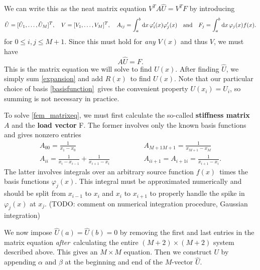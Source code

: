 We can write this as the neat matrix equation $V^T A \hat{U} = V^T F$ by introducing
\begin{equation*}
	\hat{U} = [\hat{U}_1, \dots, \hat{U}_M]^T,
	\quad
	V = [V_1, \dots, V_M]^T,
	\quad
	A_{ij} = \integral{\varphi'_i(x) \varphi'_j(x)}{x}{a}{b}
	\quad \text{and} \quad
	F_j = \integral{\varphi_j(x) f(x)}{x}{a}{b}.
\end{equation*}
for $0 \leq i, j \leq M+1$.
Since this must hold for \emph{any} $V(x)$ and thus $V$, we must have
\begin{equation}
	A \hat{U} = F.
	\label{fem_matrixeq}
\end{equation}
This is the matrix equation we will solve to find $U(x)$.
After finding $\hat{U}$, we simply sum \ref{expansion} and add $R(x)$ to find $U(x)$.
Note that our particular choice of basis \ref{basisfunction} gives the convenient property $U(x_i) = U_i$, so summing is not necessary in practice.

To solve \ref{fem_matrixeq}, we must first calculate the so-called \textbf{stiffness matrix} $A$ and the \textbf{load vector} F.
The former involves only the known basis functions and gives nonzero entries
\begin{align*}
	A_{00} = \frac{1}{x_1 - x_0}                           \qquad & \qquad A_{M+1 M+1} = \frac{1}{x_{M+1}-x_M} \\
	A_{ii} = \frac{1}{x_i-x_{i-1}} + \frac{1}{x_{i+1}-x_i} \qquad & \qquad A_{i i+1} = A_{i+1 i} = \frac{1}{x_{i+1}-x_i}.
\end{align*}
The latter involves integrals over an arbitrary source function $f(x)$ times the basis functions $\varphi_j(x)$.
This integral must be approximated numerically and should be split from $x_{i-1}$ to $x_i$ and $x_i$ to $x_{i+1}$ to properly handle the spike in $\varphi_j(x)$ at $x_j$.
(TODO: comment on numerical integration procedure, Gaussian integration)

We now impose $\hat{U}(a) = \hat{U}(b) = 0$ by removing the first and last entries in the matrix equation \emph{after} calculating the entire $(M+2) \times (M+2)$ system described above.
This gives an $M \times M$ equation.
Then we construct $U$ by appending $\alpha$ and $\beta$ at the beginning and end of the $M$-vector $\hat{U}$.

